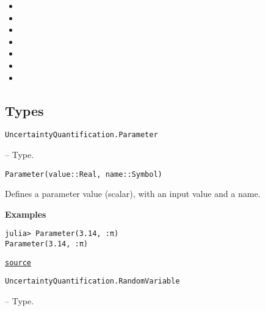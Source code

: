 \begin{itemize}
\item {}
\item {}
\item {}
\item {}
\item {}
\item {}
\item {}
\end{itemize}


\subsection{Types}



\label{12125088992129103176}{}

\hypertarget{16741877178295688592}{\texttt{UncertaintyQuantification.Parameter}}  -- {Type.}

\begin{adjustwidth}{2em}{0pt}


\begin{verbatim}
Parameter(value::Real, name::Symbol)
\end{verbatim}

Defines a parameter value (scalar), with an input value and a name.

\textbf{Examples}


\begin{verbatim}
julia> Parameter(3.14, :π)
Parameter(3.14, :π)
\end{verbatim}



\href{https://github.com/friesischscott/UncertaintyQuantification.jl/blob/f5ee6cce729f0d6a57979257379c942cdf42f86f/src/inputs/parameter.jl#L1-L11}{\texttt{source}}


\end{adjustwidth}
\hypertarget{4023900003980544990}{\texttt{UncertaintyQuantification.RandomVariable}}  -- {Type.}

